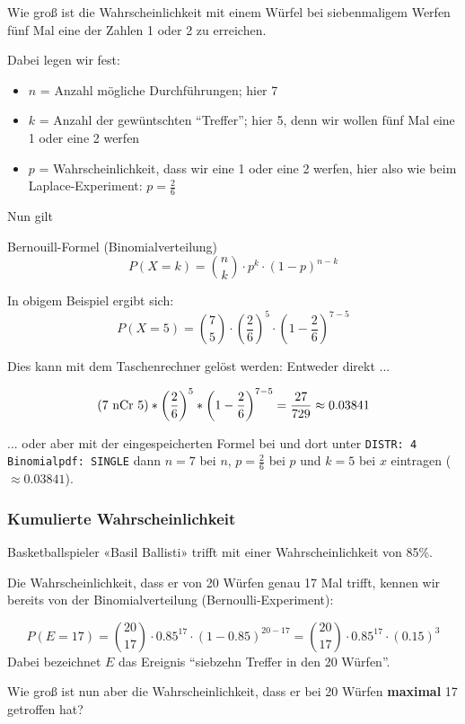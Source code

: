 Wie groß ist die Wahrscheinlichkeit mit einem Würfel bei siebenmaligem
Werfen fünf Mal eine der Zahlen 1 oder 2 zu erreichen.

Dabei legen wir fest:
\begin{itemize}
\item
  $n$ = Anzahl mögliche Durchführungen; hier 7
\item
  $k$ = Anzahl der gewüntschten ``Treffer''; hier 5, denn wir wollen fünf
Mal eine 1 oder eine 2 werfen
\item
  $p$ = Wahrscheinlichkeit, dass wir eine 1 oder eine 2 werfen, hier
  also wie beim Laplace-Experiment: $p=\frac26$
\end{itemize}

Nun gilt

\begin{gesetz}{Bernouill-Formel (Binomialverteilung)}{}
  $$P(X=k) = {{n}\choose {k}}\cdot{}p^k\cdot{}(1-p)^{n-k}$$
\end{gesetz}

In obigem Beispiel ergibt sich:
$$P(X=5) =
{{7}\choose {5}}
\cdot{}\left(\frac26\right)^5\cdot{}\left(1-\frac26\right)^{7-5}$$

Dies kann mit dem Taschenrechner gelöst werden:
Entweder direkt ...

$$( 7 \textrm{\,\,nCr\,\,} 5 ) *\left(\frac26\right)^5 *
\left(1-\frac26\right)^{7-5} = \frac{27}{729} \approx 0.03841$$

... oder aber mit der eingespeicherten Formel bei
 und dort unter \texttt{DISTR: 4
  Binomialpdf: SINGLE} dann $n=7$ bei $n$, $p=\frac26$ bei $p$ und
$k=5$ bei $x$ eintragen ($\approx 0.03841$).
\newpage
\subsubsection{Kumulierte Wahrscheinlichkeit}

Basketballspieler «Basil Ballisti» trifft mit einer
Wahrscheinlichkeit von 85\%.

Die Wahrscheinlichkeit, dass er von 20 Würfen genau 17 Mal trifft, kennen wir
bereits von der Binomialverteilung (Bernoulli-Experiment):

$$P(E=17) = {20 \choose 17}\cdot 0.85^{17}\cdot (1-0.85)^{20-17} =  {20 \choose 17}\cdot 0.85^{17}\cdot (0.15)^{3}$$
Dabei bezeichnet $E$ das Ereignis ``siebzehn Treffer in den 20 Würfen''.

Wie groß ist nun aber die Wahrscheinlichkeit, dass er bei 20 Würfen
\textbf{maximal} 17 getroffen hat?

